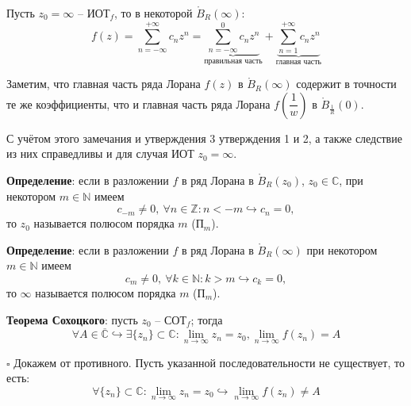 \documentclass[12pt, a4paper, reqno]{article}
\begin{document}
    Пусть $z_0 = \infty$ -- ИОТ$_f$, то в некоторой $\mathring B_R(\infty)$:
    \begin{equation*}
        f(z) = \sum\limits_{n = -\infty}^{+\infty} c_n z^n =
        \underbrace{\sum\limits_{n = -\infty}^{0} c_n z^n}_\text{правильная часть} +
        \underbrace{\sum\limits_{n = 1}^{+\infty} c_n z^n}_\text{главная часть}
    \end{equation*}

    Заметим, что главная часть ряда Лорана $f(z)$ в $\mathring B_R(\infty)$ содержит в точности
    те же коэффициенты, что и главная часть ряда Лорана $f\left(\dfrac{1}{w}\right)$ в
    $\mathring B_{\frac{1}{R}}(0)$.

    С учётом этого замечания и утверждения 3 утверждения 1 и 2, а также следствие из них справедливы
    и для случая ИОТ $z_0 = \infty$.

    \textbf{Определение}: если в разложении $f$ в ряд Лорана в $\mathring B_R(z_0)$, $z_0 \in \mathbb{C}$,  
    при некотором $m \in \mathbb{N}$ имеем
    \begin{equation*}
        c_{-m} \neq 0,\ \forall n \in \mathbb{Z}: n < -m \hookrightarrow c_n = 0,
    \end{equation*}
    то $z_0$ называется полюсом порядка $m$ (П$_m$).

    \textbf{Определение}: если в разложении $f$ в ряд Лорана в $\mathring B_R(\infty)$ при некотором
    $m \in \mathbb{N}$ имеем
    \begin{equation*}
        c_m \neq 0,\ \forall k \in \mathbb{N}: k > m \hookrightarrow c_k = 0,
    \end{equation*}
    то $\infty$ называется полюсом порядка $m$ (П$_m$).

    \textbf{Теорема Сохоцкого}: пусть $z_0$ -- СОТ$_f$; тогда
    \begin{equation*}
        \forall A \in \overline{\mathbb{C}} \hookrightarrow \exists \{z_n\} \subset \mathbb{C}:
        \lim\limits_{n \to \infty} z_n = z_0, \lim\limits_{n \to \infty} f(z_n) = A
    \end{equation*}

    $\square$ Докажем от противного. Пусть указанной последовательности не существует, то есть:
    \begin{equation}\label{sohotsky}
        \forall \{z_n\} \subset \mathbb{C} : \lim\limits_{n \to \infty} z_n = z_0 \hookrightarrow
        \lim\limits_{n \to \infty} f(z_n) \neq A
    \end{equation}
\end{document}
